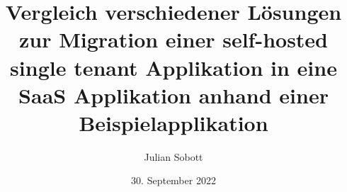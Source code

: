 \documentclass[oneside]{ausarbeitung}
\begin{document}

   \Bachelorarbeit


    \Informatik

    \title{Vergleich verschiedener Lösungen zur Migration einer self-hosted single tenant Applikation in eine SaaS Applikation anhand einer Beispielapplikation}

    \author{Julian Sobott }

   \examinerIsAProfessortrue   %


    \date{30. September 2022}



    \maketitle
    \cleardoublepage

    \setcounter{page}{1}



    \cleardoublepage

    

    \appendix
    \printbibliography[heading=bibintoc]
\end{document}
